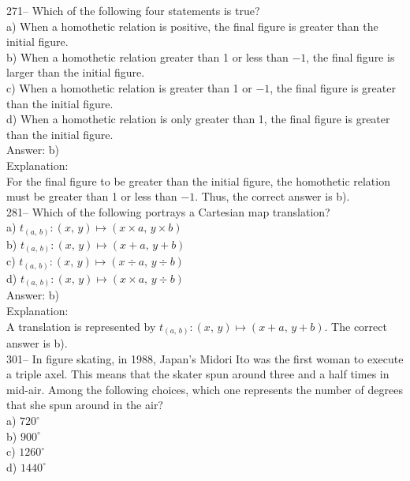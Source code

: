 \documentclass[letterpaper, 12pt]{article}
\begin{document}
271-- Which of the following four statements is true?\\

a) When a homothetic relation is positive, the final figure is greater than the initial figure.\\
b) When a homothetic relation greater than 1 or less than $-1$, the final figure is larger than the initial figure.\\
c) When a homothetic relation is greater than 1 or $-1$, the final figure is greater than the initial figure.\\
d) When a homothetic relation is only greater than 1, the final figure is greater than the initial figure.\\

Answer: b)\\

Explanation: \\
For the final figure to be greater than the initial figure, the homothetic relation must be greater than 1 or less than $-1$.
Thus, the correct answer is b).\\



281-- Which of the following portrays a Cartesian map translation?\\

a) $t_{\left( a,\,b\right) } :\left( x,\,y\right) \longmapsto \left( x\times
a,\,y\times b\right) $\\
b) $t_{\left( a,\,b\right) } :\left(x,\,y\right)\longmapsto
\left(x+a,\,y+b\right) $\\
c) $t_{\left( a,\,b\right) } :\left(x,\,y\right)\longmapsto \left(x\div
a,\,y\div b\right) $\\
d) $t_{\left( a,\,b\right) } :\left(x,\,y\right)\longmapsto \left(x\times
a,\,y\div b\right) $\\

Answer: b)\\

Explanation:\\
A translation is represented by $t_{\left( a,\,b\right) }
:\left(x,\,y\right)\longmapsto \left(x+a,\,y+b\right)$.  The correct answer is b).\\



301-- In figure skating, in 1988, Japan's Midori Ito was the first woman to execute a triple axel. This means that the skater spun around three and a half times in mid-air. Among the following choices, which one represents the number of degrees that she spun around in the air?\\
a) $720^{\circ}$\\
b) $900^{\circ}$\\
c) $1260^{\circ}$\\
d) $1440^{\circ}$\\
\end{document}
